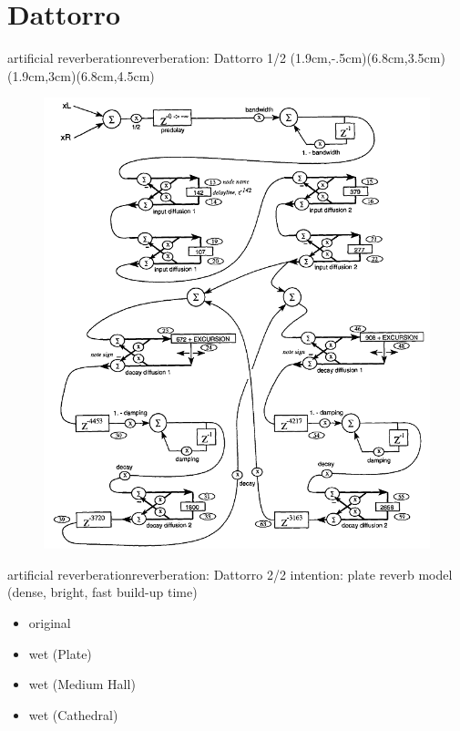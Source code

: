 \section{Dattorro}
\begin{frame}{artificial reverberation}{reverberation: Dattorro 1/2}
	\vspace{-7mm}
    (1.9cm,-.5cm)(6.8cm,3.5cm)
    (1.9cm,3cm)(6.8cm,4.5cm)
    \begin{figure}
		\centerline{\includegraphics[scale=.37]{graph/dattorro}}
	\end{figure} 
\end{frame}

\begin{frame}{artificial reverberation}{reverberation: Dattorro 2/2}
	intention: plate reverb model \pause (dense, bright, fast build-up time)
    \bigskip
    \begin{itemize}
        \item   original 
        \item   wet (Plate) 
        \item   wet (Medium Hall) 
        \item   wet (Cathedral) 
    \end{itemize}
\end{frame}

